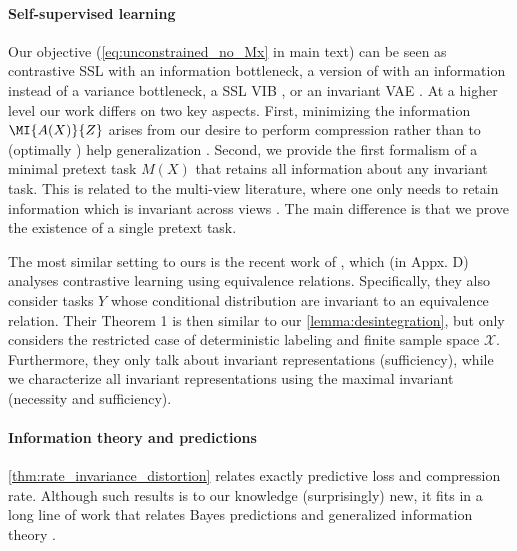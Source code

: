 \documentclass[final]{article}
\begin{document}
\paragraph{Self-supervised learning}
Our objective (\cref{eq:unconstrained_no_Mx} in main text)  can be seen as contrastive SSL \cite{oord_representation_2019,chen_simple_2020} with an information bottleneck,
a version of \cite{zbontar_barlow_2021,bardes_vicreg_2021} with an information instead of a variance bottleneck,
a SSL VIB \cite{alemi_deep_2017}, or
an invariant VAE \cite{kingma_auto-encoding_2014}.
At a higher level our work differs on two key aspects.
First, minimizing the information $\MI{A(X)}{Z}$ arises from our desire to perform compression rather than to (optimally \cite{dubois_learning_2020}) help generalization \cite{shamir_learning_2010,vera_role_2018}.
Second, we provide the first formalism of a minimal pretext task $M(X)$ that retains all information about any invariant task.
This is related to the multi-view literature, where one only needs to retain information which is invariant across views \cite{sridharan_information_2008,tosh_contrastive_2021,lee_predicting_2020,tsai_self-supervised_2021}.
The main difference is that we prove the existence of a single pretext task.

The most similar setting to ours is the recent work of \citet{mitrovic_representation_2021}, which (in Appx. D) analyses contrastive learning using equivalence relations. 
Specifically, they also consider tasks $Y$ whose conditional distribution are invariant to an equivalence relation.
Their Theorem 1 is then similar to our \cref{lemma:desintegration}, but only considers the restricted case of deterministic labeling and finite sample space $\mathcal{X}$. Furthermore, they only talk about invariant representations (sufficiency), while we characterize all invariant representations using the maximal invariant (necessity and sufficiency).




\paragraph{Information theory and predictions}
\cref{thm:rate_invariance_distortion} relates exactly predictive loss and compression rate.
Although such results is to our knowledge (surprisingly) new, it fits in a long line of work that relates Bayes predictions and generalized information theory \cite{degroot_uncertainty_1962,grunwald_game_2004,gneiting_strictly_2007,duchi_multiclass_2018,farnia_minimax_2016,dubois_learning_2020,xu_minimum_2020}. 
\end{document}
